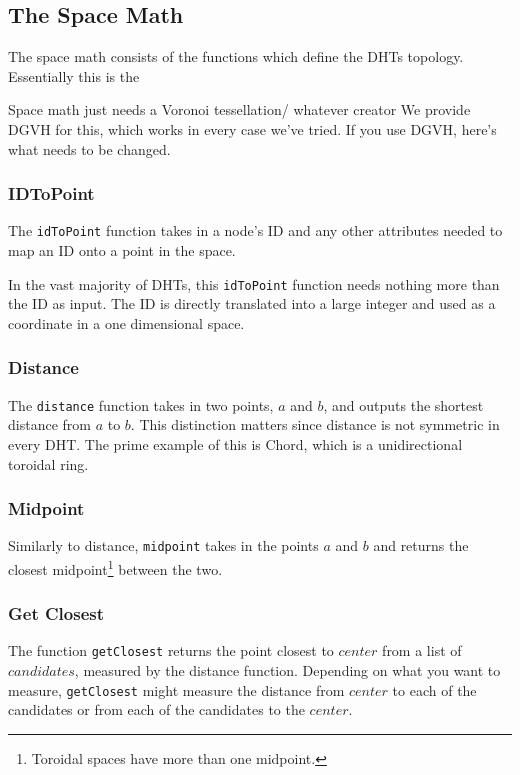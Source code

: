 \documentclass[11pt,conference]{IEEEtran}
\begin{document}
\subsection{The Space Math}
\label{sec:space}
The space math consists of the functions which define the DHTs topology.
Essentially this is the

Space math just needs a Voronoi tessellation/ whatever creator
We provide DGVH for this, which works in every case we've tried.
If you use DGVH, here's what needs to be changed.

\subsubsection{IDToPoint}
The \texttt{idToPoint} function takes in a node's ID and any other attributes needed to map an ID onto a point in the space.

In the vast majority of DHTs, this \texttt{idToPoint} function needs nothing more than the ID as input.
The ID is directly translated into a large integer and used as a coordinate in a one dimensional space.


\subsubsection{Distance}
The \texttt{distance} function takes in two points, $a$ and $b$, and outputs the shortest distance from $a$ to $b$.
This distinction matters since distance is not symmetric in every DHT.
The prime example of this is Chord, which is a unidirectional toroidal ring.


\subsubsection{Midpoint}

Similarly to distance, \texttt{midpoint} takes in the points $ a $ and $ b $ and returns the closest midpoint\footnote{Toroidal spaces have more than one midpoint.} between the two.

\subsubsection{Get Closest}
The function \texttt{getClosest} returns the point closest to $ center$ from a list of $ candidates$, measured by the distance function.
Depending on what you want to measure, \texttt{getClosest} might measure the distance from $ center$ to each of the candidates or from each of the candidates to the $ center$.
\end{document}
